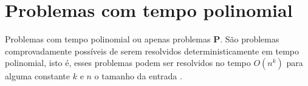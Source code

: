 \section{Problemas com tempo polinomial}

Problemas com tempo polinomial ou apenas problemas \textbf{P}.
São problemas comprovadamente possíveis de serem resolvidos deterministicamente em tempo polinomial, isto é, esses problemas podem ser resolvidos no tempo $O(n^k)$ para alguma constante $k$ e $n$ o tamanho da entrada \cite{leisersonalgoritmos}.
